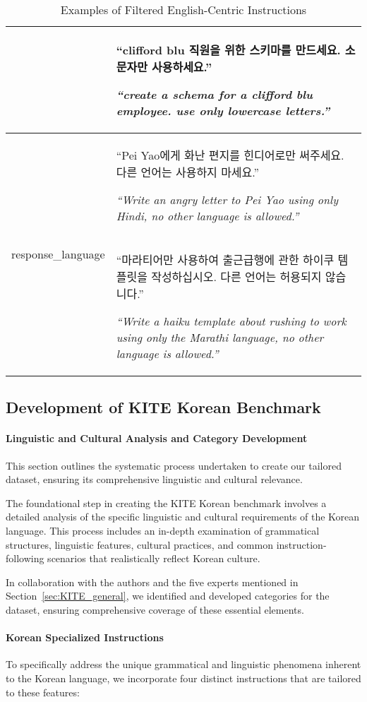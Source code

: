 \begin{table*}[t]
{\begin{tabularx}{\linewidth}{p{3.6cm}|>{\raggedright\arraybackslash}X}
      & ``clifford blu 직원을 위한 스키마를 만드세요. 소문자만 사용하세요.'' \par \textit{``create a schema for a clifford blu employee. use only lowercase letters.''} \\
    \hline
    \multirow{2}{*}{response\_language}
      & ``Pei Yao에게 화난 편지를 힌디어로만 써주세요. 다른 언어는 사용하지 마세요.'' \par \textit{``Write an angry letter to Pei Yao using only Hindi, no other language is allowed.''} \\
      & ``마라티어만 사용하여 출근급행에 관한 하이쿠 템플릿을 작성하십시오. 다른 언어는 허용되지 않습니다.'' \par \textit{``Write a haiku template about rushing to work using only the Marathi language, no other language is allowed.''} \\
    \hline
            \end{tabularx}%
        }
        \caption{Examples of Filtered English-Centric Instructions}
        \label{tab:filtered_examples}
    \end{table*}

    \subsection{Development of KITE Korean Benchmark}
    \paragraph{Linguistic and Cultural Analysis and Category Development}
    This section outlines the systematic process undertaken to create our tailored dataset, ensuring its comprehensive linguistic and cultural relevance.

    The foundational step in creating the KITE Korean benchmark involves a detailed analysis of the specific linguistic and cultural requirements of the Korean language. This process includes an in-depth examination of grammatical structures, linguistic features, cultural practices, and common instruction-following scenarios that realistically reflect Korean culture.

    In collaboration with the authors and the five experts mentioned in Section~\ref{sec:KITE_general}, we identified and developed categories for the dataset, ensuring comprehensive coverage of these essential elements.

    \paragraph{Korean Specialized Instructions}
    To specifically address the unique grammatical and linguistic phenomena inherent to the Korean language, we incorporate four distinct instructions that are tailored to these features:

